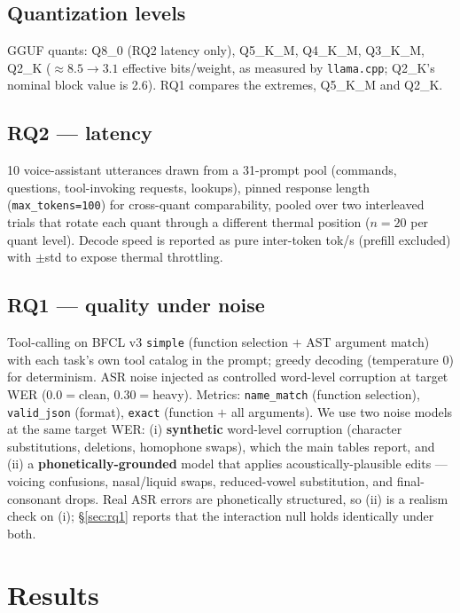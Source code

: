\documentclass[11pt]{article}
\newcommand{\code}[1]{\texttt{#1}}
\begin{document}
\subsection{Quantization levels}
GGUF quants: Q8\_0 (RQ2 latency only), Q5\_K\_M, Q4\_K\_M, Q3\_K\_M, Q2\_K
(${\approx}8.5 \rightarrow 3.1$ effective bits/weight, as measured by \code{llama.cpp};
Q2\_K's nominal block value is 2.6). RQ1 compares the extremes, Q5\_K\_M and Q2\_K.

\subsection{RQ2 --- latency}
10 voice-assistant utterances drawn from a 31-prompt pool (commands, questions,
tool-invoking requests, lookups), pinned response length (\code{max\_tokens=100}) for
cross-quant comparability, pooled over two interleaved trials that rotate each quant
through a different thermal position ($n{=}20$ per quant level). Decode speed is
reported as pure inter-token tok/s (prefill excluded) with $\pm$std to expose thermal
throttling.

\subsection{RQ1 --- quality under noise}
Tool-calling on BFCL v3 \code{simple} (function selection $+$ AST argument match) with
each task's own tool catalog in the prompt; greedy decoding (temperature 0) for
determinism. ASR noise injected as controlled word-level corruption at target WER
($0.0={}$clean, $0.30={}$heavy). Metrics: \code{name\_match} (function selection),
\code{valid\_json} (format), \code{exact} (function $+$ all arguments). We use two
noise models at the same target WER: (i) \textbf{synthetic} word-level corruption
(character substitutions, deletions, homophone swaps), which the main tables report,
and (ii) a \textbf{phonetically-grounded} model that applies acoustically-plausible
edits --- voicing confusions, nasal/liquid swaps, reduced-vowel substitution, and
final-consonant drops. Real ASR errors are phonetically structured, so (ii) is a
realism check on (i); \S\ref{sec:rq1} reports that the interaction null holds
identically under both.

\section{Results}
\end{document}
